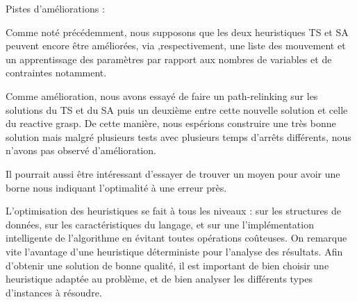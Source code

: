Pistes d'améliorations :

Comme noté précédemment, nous supposons que les deux heuristiques TS et SA peuvent encore être améliorées, via ,respectivement, une liste des mouvement et un apprentissage des paramètres par rapport aux nombres de variables et de contraintes notamment. 

Comme amélioration, nous avons essayé de faire un path-relinking sur les solutions du TS et du SA puis un deuxième entre cette nouvelle solution et celle du reactive grasp. De cette manière, nous espérions construire une très bonne solution mais malgré plusieurs tests avec plusieurs temps d'arrêts différents, nous n'avons pas observé d'amélioration.

Il pourrait aussi être intéressant d'essayer de trouver un moyen pour avoir une borne nous indiquant l'optimalité à une erreur près. 



L'optimisation des heuristiques se fait à tous les niveaux : sur les structures de données, sur les caractéristiques du langage, et sur une l'implémentation intelligente de l'algorithme en évitant toutes opérations coûteuses. On remarque vite l'avantage d'une heuristique déterministe pour l'analyse des résultats. Afin d'obtenir une solution de bonne qualité, il est important de bien choisir une heuristique adaptée au problème, et de bien analyser les différents types d'instances à résoudre.





